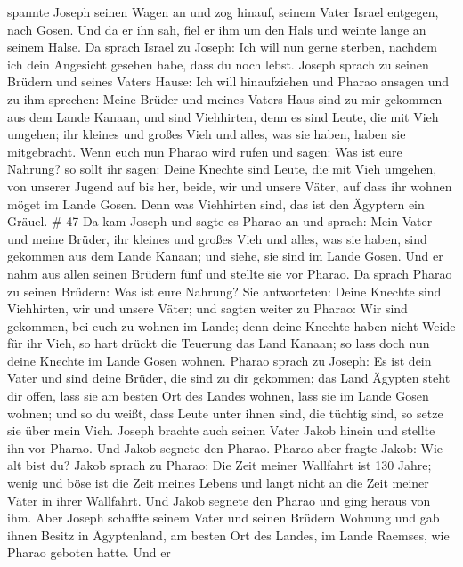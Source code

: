 spannte Joseph seinen Wagen an und zog hinauf, seinem Vater Israel
entgegen, nach Gosen. Und da er ihn sah, fiel er ihm um den Hals und
weinte lange an seinem Halse.  Da sprach Israel zu Joseph:
Ich will nun gerne sterben, nachdem ich dein Angesicht gesehen habe,
dass du noch lebst.  Joseph sprach zu seinen Brüdern und
seines Vaters Hause: Ich will hinaufziehen und Pharao ansagen und zu ihm
sprechen: Meine Brüder und meines Vaters Haus sind zu mir gekommen aus
dem Lande Kanaan,  und sind Viehhirten, denn es sind Leute,
die mit Vieh umgehen; ihr kleines und großes Vieh und alles, was sie
haben, haben sie mitgebracht.  Wenn euch nun Pharao wird
rufen und sagen: Was ist eure Nahrung?  so sollt ihr sagen:
Deine Knechte sind Leute, die mit Vieh umgehen, von unserer Jugend auf
bis her, beide, wir und unsere Väter, auf dass ihr wohnen möget im Lande
Gosen. Denn was Viehhirten sind, das ist den Ägyptern ein Gräuel. \# 47
 Da kam Joseph und sagte es Pharao an und sprach: Mein Vater
und meine Brüder, ihr kleines und großes Vieh und alles, was sie haben,
sind gekommen aus dem Lande Kanaan; und siehe, sie sind im Lande Gosen.
 Und er nahm aus allen seinen Brüdern fünf und stellte sie
vor Pharao.  Da sprach Pharao zu seinen Brüdern: Was ist
eure Nahrung? Sie antworteten: Deine Knechte sind Viehhirten, wir und
unsere Väter;  und sagten weiter zu Pharao: Wir sind
gekommen, bei euch zu wohnen im Lande; denn deine Knechte haben nicht
Weide für ihr Vieh, so hart drückt die Teuerung das Land Kanaan; so lass
doch nun deine Knechte im Lande Gosen wohnen.  Pharao sprach
zu Joseph: Es ist dein Vater und sind deine Brüder, die sind zu dir
gekommen;  das Land Ägypten steht dir offen, lass sie am
besten Ort des Landes wohnen, lass sie im Lande Gosen wohnen; und so du
weißt, dass Leute unter ihnen sind, die tüchtig sind, so setze sie über
mein Vieh.  Joseph brachte auch seinen Vater Jakob hinein
und stellte ihn vor Pharao. Und Jakob segnete den Pharao. 
Pharao aber fragte Jakob: Wie alt bist du?  Jakob sprach zu
Pharao: Die Zeit meiner Wallfahrt ist 130 Jahre; wenig und böse ist die
Zeit meines Lebens und langt nicht an die Zeit meiner Väter in ihrer
Wallfahrt.  Und Jakob segnete den Pharao und ging heraus
von ihm.  Aber Joseph schaffte seinem Vater und seinen
Brüdern Wohnung und gab ihnen Besitz in Ägyptenland, am besten Ort des
Landes, im Lande Raemses, wie Pharao geboten hatte.  Und er
